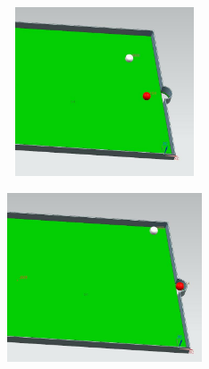 \documentclass[12pt]{article}
\begin{document}
{\begin{figure}[H]
		\begin{subfigure}{0.49\textwidth}
			\centering\includegraphics[height=5cm,width=1\textwidth,keepaspectratio]{var7_3.jpeg}
			\caption{}
			\label{fig:var7_3.jpeg}
		\end{subfigure}
		\begin{subfigure}{0.49\textwidth}
			\centering\includegraphics[height=5cm,width=1\textwidth,keepaspectratio]{var7_4.jpeg}
			\caption{}
			\label{fig:var7_4.jpeg}
		\end{subfigure}
	\end{figure}
}
\end{document}
